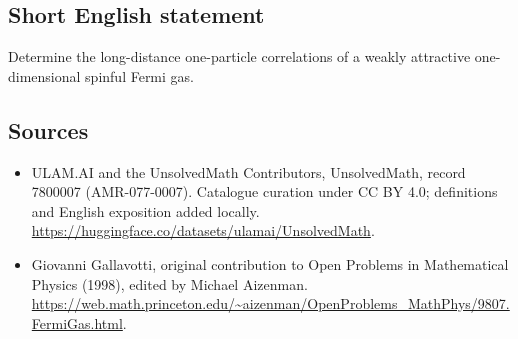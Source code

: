 \documentclass[11pt]{article}
\begin{document}
\subsection{Short English statement}
Determine the long-distance one-particle correlations of a weakly attractive one-dimensional spinful Fermi gas.
\subsection{Sources}
\begin{itemize}
\item[\hypertarget{source:7800007:1}{S1}] ULAM.AI and the UnsolvedMath Contributors, UnsolvedMath, record 7800007 (AMR-077-0007). Catalogue curation under CC BY 4.0; definitions and English exposition added locally.
\url{https://huggingface.co/datasets/ulamai/UnsolvedMath}.
\item[\hypertarget{source:7800007:2}{S2}] Giovanni Gallavotti, original contribution to Open Problems in Mathematical Physics (1998), edited by Michael Aizenman.
\url{https://web.math.princeton.edu/~aizenman/OpenProblems_MathPhys/9807.FermiGas.html}.
\end{itemize}
\label{end:7800007}
\end{document}
